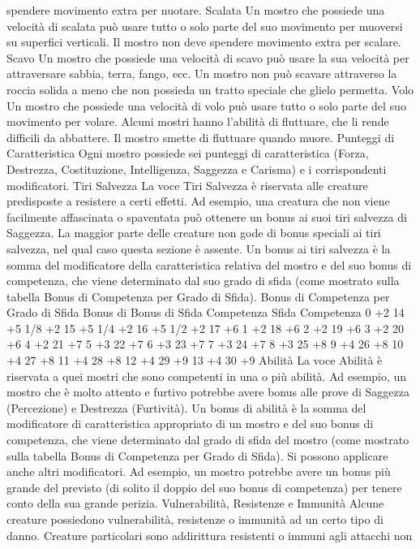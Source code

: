 \begin{multicols}{2}
spendere movimento extra per nuotare.
Scalata
Un mostro che possiede una velocità di scalata può
usare tutto o solo parte del suo movimento per
muoversi su superfici verticali. Il mostro non deve
spendere movimento extra per scalare.
Scavo
Un mostro che possiede una velocità di scavo può
usare la sua velocità per attraversare sabbia, terra,
fango, ecc. Un mostro non può scavare attraverso la
roccia solida a meno che non possieda un tratto
speciale che glielo permetta.
Volo
Un mostro che possiede una velocità di volo può usare
tutto o solo parte del suo movimento per volare. Alcuni
mostri hanno l’abilità di fluttuare, che li rende difficili da
abbattere. Il mostro smette di fluttuare quando muore.
Punteggi di Caratteristica
Ogni mostro possiede sei punteggi di caratteristica
(Forza, Destrezza, Costituzione, Intelligenza, Saggezza
e Carisma) e i corrispondenti modificatori.
Tiri Salvezza
La voce Tiri Salvezza è riservata alle creature
predisposte a resistere a certi effetti. Ad esempio, una
creatura che non viene facilmente affascinata o
spaventata può ottenere un bonus ai suoi tiri salvezza
di Saggezza. La maggior parte delle creature non gode
di bonus speciali ai tiri salvezza, nel qual caso questa
sezione è assente.
Un bonus ai tiri salvezza è la somma del modificatore
della caratteristica relativa del mostro e del suo bonus
di competenza, che viene determinato dal suo grado di
sfida (come mostrato sulla tabella Bonus di
Competenza per Grado di Sfida).
Bonus di Competenza per Grado di Sfida
Bonus di Bonus di
Sfida Competenza Sfida Competenza
0 +2 14 +5
1/8 +2 15 +5
1/4 +2 16 +5
1/2 +2 17 +6
1 +2 18 +6
2 +2 19 +6
3 +2 20 +6
4 +2 21 +7
5 +3 22 +7
6 +3 23 +7
7 +3 24 +7
8 +3 25 +8
9 +4 26 +8
10 +4 27 +8
11 +4 28 +8
12 +4 29 +9
13 +4 30 +9
Abilità
La voce Abilità è riservata a quei mostri che sono
competenti in una o più abilità. Ad esempio, un mostro
che è molto attento e furtivo potrebbe avere bonus alle
prove di Saggezza (Percezione) e Destrezza (Furtività).
Un bonus di abilità è la somma del modificatore di
caratteristica appropriato di un mostro e del suo bonus
di competenza, che viene determinato dal grado di
sfida del mostro (come mostrato sulla tabella Bonus di
Competenza per Grado di Sfida). Si possono applicare
anche altri modificatori. Ad esempio, un mostro
potrebbe avere un bonus più grande del previsto (di
solito il doppio del suo bonus di competenza) per
tenere conto della sua grande perizia.
Vulnerabilità, Resistenze e
Immunità
Alcune creature possiedono vulnerabilità, resistenze o
immunità ad un certo tipo di danno. Creature particolari
sono addirittura resistenti o immuni agli attacchi non

\end{multicols}
